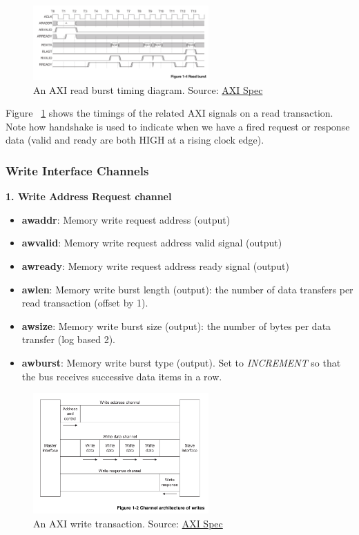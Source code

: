 \documentclass[11pt]{article}
\begin{document}
\begin{figure}[hbt]
\begin{center}
  \includegraphics[width=0.6\textwidth]{axi_read_burst.png}
  \caption{An AXI read burst timing diagram. Source: \href{https://developer.arm.com/documentation/ihi0022/b}{AXI Spec}}
  \label{fig:axi_read_burst}
\end{center}
\end{figure}

Figure ~\ref{fig:axi_read_burst} shows the timings of the related AXI signals on a read transaction. Note how handshake is used to indicate when we have a fired request or response data (valid and ready are both HIGH at a rising clock edge).

\subsubsection{Write Interface Channels}

\textbf{1. Write Address Request channel}
\begin{itemize}
\item \textbf{awaddr}: Memory write request address (output)
\item \textbf{awvalid}: Memory write request address valid signal (output)
\item \textbf{awready}: Memory write request address ready signal (output)
\item \textbf{awlen}: Memory write burst length (output): the number of data transfers per read transaction (offset by 1).
\item \textbf{awsize}: Memory write burst size (output): the number of bytes per data transfer (log based 2).
\item \textbf{awburst}: Memory write burst type (output). Set to \textit{INCREMENT} so that the bus receives successive data items in a row.
\end{itemize}

\begin{figure}[hbt]
\begin{center}
  \includegraphics[width=0.6\textwidth]{axi_write.png}
  \caption{An AXI write transaction. Source: \href{https://developer.arm.com/documentation/ihi0022/b}{AXI Spec}}
  \label{fig:axi_write}
\end{center}
\end{figure}
\end{document}
